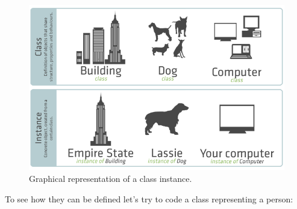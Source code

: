 \begin{figure}
\centering
\includegraphics[width=0.8\linewidth]{classes_instances.png}
\caption{Graphical representation of a class instance.}
\end{figure}

To see how they can be defined let's try to code a class representing a person:

